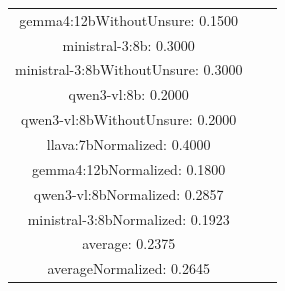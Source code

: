 \documentclass[a4paper]{article}
\begin{document}
\begin{tabular}{ccc}
gemma4:12bWithoutUnsure: 0.1500 \\ ministral-3:8b: 0.3000 \\ ministral-3:8bWithoutUnsure: 0.3000 \\ qwen3-vl:8b: 0.2000 \\ qwen3-vl:8bWithoutUnsure: 0.2000 \\ llava:7bNormalized: 0.4000 \\ gemma4:12bNormalized: 0.1800 \\ qwen3-vl:8bNormalized: 0.2857 \\ ministral-3:8bNormalized: 0.1923 \\ average: 0.2375 \\ averageNormalized: 0.2645 \end{minipage}\\
\end{tabular}

\vspace{5mm}
\end{document}
